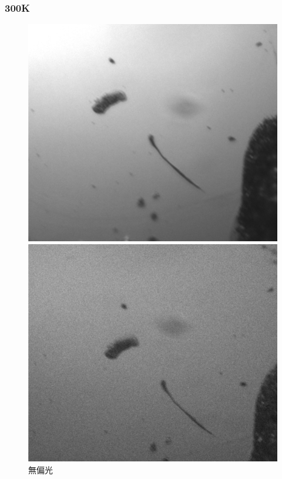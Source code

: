 \documentclass[11pt,a4paper]{jsarticle}
\begin{document}
\subsubsection{300K}
\begin{figure}[htbp]
 \begin{minipage}{0.333\hsize}
  \begin{center}
   \includegraphics[width=\hsize]{nonpol300.eps}
  \end{center}
  \caption{無偏光}
  \label{fig:nonpol300}
 \end{minipage}
 \begin{minipage}{0.333\hsize}
  \begin{center}
   \includegraphics[width=\hsize]{hh300.eps}

\end{center}
\end{minipage}
\end{figure}
\end{document}
